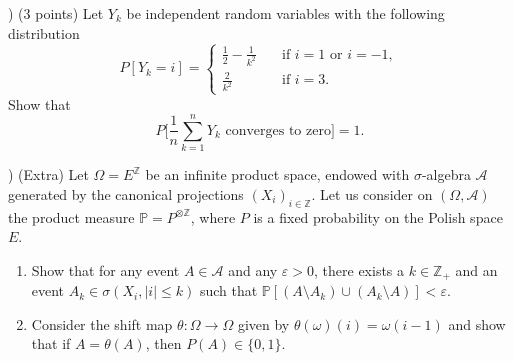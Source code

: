 \documentclass{article}
\newcommand*\1{\mathds{1}}
\begin{document}
\newpage

\vspace{4mm}

) (3 points) Let $Y_k$ be independent random variables with the following distribution
\begin{equation}
  P[Y_k = i] =
  \begin{cases}
    \frac 12 - \frac 1{k^2} \quad & \text{if $i = 1$ or $i = -1$},\\
    \frac 2{k^2} & \text{if $i = 3$.}
  \end{cases}
\end{equation}
Show that
\begin{equation}
  P\Big[ \frac 1n \sum_{k=1}^n Y_k \text{ converges to zero} \Big] = 1.
\end{equation}


\vspace{4mm}

) (Extra) Let $\Omega = E^\mathbb{Z}$ be an infinite product space, endowed with $\sigma$-algebra $\mathcal{A}$ generated by the canonical projections $(X_i)_{i \in \mathbb{Z}}$.
Let us consider on $(\Omega, \mathcal{A})$ the product measure $\mathbb{P} = P^{\otimes \mathbb{Z}}$, where $P$ is a fixed probability on the Polish space $E$.
\begin{enumerate}[\quad a)]
\item Show that for any event $A \in \mathcal{A}$ and any $\varepsilon > 0$, there exists a $k \in \mathbb{Z}_+$ and an event $A_k \in \sigma(X_i, |i| \leq k)$ such that $\mathbb{P}[(A \setminus A_k) \cup (A_k \setminus A)] < \varepsilon$.
\item Consider the shift map $\theta:\Omega \to \Omega$ given by $\theta(\omega)(i) = \omega(i-1)$ and show that if $A = \theta(A)$, then $P(A) \in \{0,1\}$.
\end{enumerate}
\end{document}

